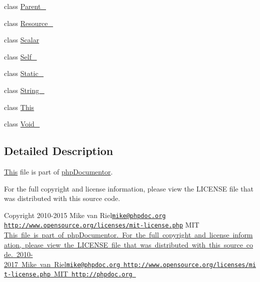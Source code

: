 \begin{DoxyCompactItemize}
\item 
class \mbox{\hyperlink{classphp_documentor_1_1_reflection_1_1_types_1_1_parent__}{Parent\+\_\+}}
\item 
class \mbox{\hyperlink{classphp_documentor_1_1_reflection_1_1_types_1_1_resource__}{Resource\+\_\+}}
\item 
class \mbox{\hyperlink{classphp_documentor_1_1_reflection_1_1_types_1_1_scalar}{Scalar}}
\item 
class \mbox{\hyperlink{classphp_documentor_1_1_reflection_1_1_types_1_1_self__}{Self\+\_\+}}
\item 
class \mbox{\hyperlink{classphp_documentor_1_1_reflection_1_1_types_1_1_static__}{Static\+\_\+}}
\item 
class \mbox{\hyperlink{classphp_documentor_1_1_reflection_1_1_types_1_1_string__}{String\+\_\+}}
\item 
class \mbox{\hyperlink{classphp_documentor_1_1_reflection_1_1_types_1_1_this}{This}}
\item 
class \mbox{\hyperlink{classphp_documentor_1_1_reflection_1_1_types_1_1_void__}{Void\+\_\+}}
\end{DoxyCompactItemize}


\subsection{Detailed Description}
\mbox{\hyperlink{classphp_documentor_1_1_reflection_1_1_types_1_1_this}{This}} file is part of \mbox{\hyperlink{namespacephp_documentor}{php\+Documentor}}.

For the full copyright and license information, please view the L\+I\+C\+E\+N\+SE file that was distributed with this source code.

\begin{DoxyCopyright}{Copyright}
2010-\/2015 Mike van Riel\href{mailto:mike@phpdoc.org}{\tt mike@phpdoc.\+org}  \href{http://www.opensource.org/licenses/mit-license.php}{\tt http\+://www.\+opensource.\+org/licenses/mit-\/license.\+php} M\+IT \mbox{\hyperlink{}{This file is part of php\+Documentor. For the full copyright and license information, please view the L\+I\+C\+E\+N\+SE file that was distributed with this source code.  2010-\/2017 Mike van Riel\href{mailto:mike@phpdoc.org}{\tt mike@phpdoc.\+org}  \href{http://www.opensource.org/licenses/mit-license.php}{\tt http\+://www.\+opensource.\+org/licenses/mit-\/license.\+php} M\+IT  \href{http://phpdoc.org}{\tt http\+://phpdoc.\+org} }}
\end{DoxyCopyright}
